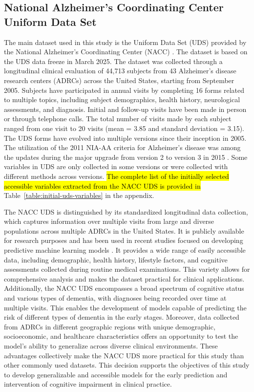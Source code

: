\subsection{National Alzheimer's Coordinating Center Uniform Data Set}
The main dataset used in this study is the Uniform Data Set (\acrshort{UDS}) provided by the National Alzheimer's Coordinating Center (\acrshort{NACC}) \cite{Beekly2007National}. The dataset is based on the UDS data freeze in March 2025. The dataset was collected through a longitudinal clinical evaluation of 44,713 subjects from 43 Alzheimer's disease research centers (\acrshort{ADRCs}) across the United States, starting from September 2005. Subjects have participated in annual visits by completing 16 forms related to multiple topics, including subject demographics, health history, neurological assessments, and diagnosis. Initial and follow-up visits have been made in person or through telephone calls. The total number of visits made by each subject ranged from one visit to 20 visits (mean = 3.85 and standard deviation = 3.15). The UDS forms have evolved into multiple versions since their inception in 2005. The utilization of the 2011 NIA-AA criteria for Alzheimer’s disease was among the updates during the major upgrade from version 2 to version 3 in 2015 \cite{Besser2018Version}. Some variables in UDS are only collected in some versions or were collected with different methods across versions. \hl{The complete list of the initially selected accessible variables extracted from the NACC UDS is provided in} Table~\ref{table:initial-uds-variables} in the appendix.

The NACC UDS is distinguished by its standardized longitudinal data collection, which captures information over multiple visits from large and diverse populations across multiple ADRCs in the United States. It is publicly available for research purposes and has been used in recent studies focused on developing predictive machine learning models \cite{abbas2024Explainable, Pang2023Predicting, Ren2023Improving}. It provides a wide range of easily accessible data, including demographic, health history, lifestyle factors, and cognitive assessments collected during routine medical examinations. This variety allows for comprehensive analysis and makes the dataset practical for clinical applications. Additionally, the NACC UDS encompasses a broad spectrum of cognitive status and various types of dementia, with diagnoses being recorded over time at multiple visits. This enables the development of models capable of predicting the risk of different types of dementia in the early stages. Moreover, data collected from ADRCs in different geographic regions with unique demographic, socioeconomic, and healthcare characteristics offers an opportunity to test the model’s ability to generalize across diverse clinical environments. These advantages collectively make the NACC UDS more practical for this study than other commonly used datasets. This decision supports the objectives of this study to develop generalizable and accessible models for the early prediction and intervention of cognitive impairment in clinical practice.

